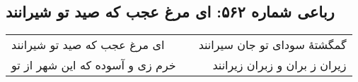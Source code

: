 \begin{center}
\section*{رباعی شماره ۵۶۲: ای مرغ عجب که صید تو شیرانند}
\label{sec:0562}
\begin{longtable}{l p{0.5cm} r}
ای مرغ عجب که صید تو شیرانند
&&
گمگشتهٔ سودای تو جان سیرانند
\\
خرم زی و آسوده که این شهر از تو
&&
زیران ز بران و زبران زیرانند
\\
\end{longtable}
\end{center}
